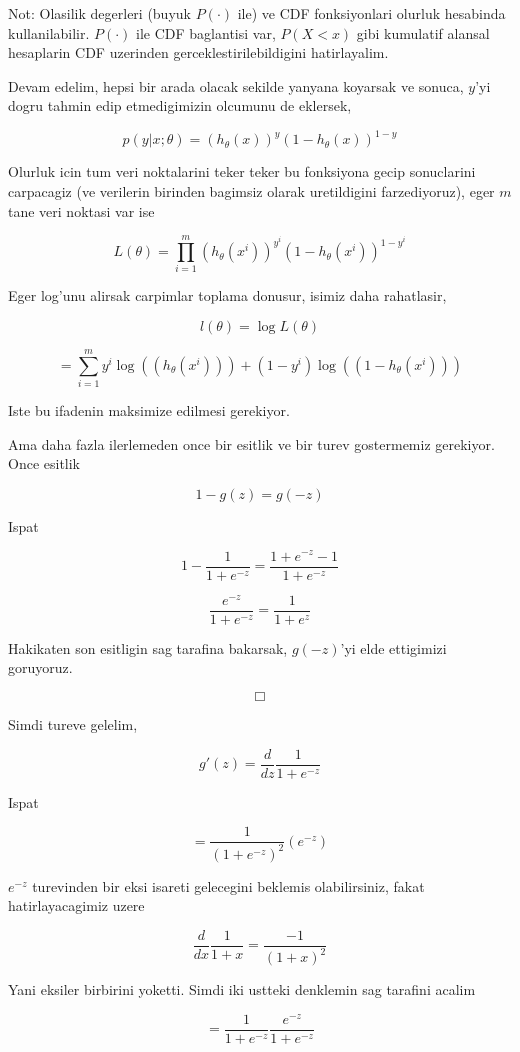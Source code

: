 \documentclass[12pt,fleqn]{article}\usepackage{../common}
\begin{document}
Not: Olasilik degerleri (buyuk $P(\cdot)$ ile) ve CDF fonksiyonlari
olurluk hesabinda kullanilabilir. $P(\cdot)$ ile CDF baglantisi var,
$P(X<x)$ gibi kumulatif alansal hesaplarin CDF uzerinden
gerceklestirilebildigini hatirlayalim.

Devam edelim, hepsi bir arada olacak sekilde yanyana koyarsak ve
sonuca, $y$'yi dogru tahmin edip etmedigimizin olcumunu de eklersek,

$$p(y | x;\theta) = (h_\theta(x))^y (1-h_\theta(x))^{1-y}$$

Olurluk icin tum veri noktalarini teker teker bu fonksiyona gecip
sonuclarini carpacagiz (ve verilerin birinden bagimsiz olarak
uretildigini farzediyoruz), eger $m$ tane veri noktasi var ise

$$ L(\theta) = \prod_{i=1}^{m} (h_\theta(x^i))^{y^i}
(1-h_\theta(x^i))^{1-{y^i}}$$

Eger log'unu alirsak carpimlar toplama donusur, isimiz daha rahatlasir,

$$ l(\theta) = \log L(\theta) $$

$$ = \sum_{i=1}^{m}
     y^i \log( (h_\theta(x^i)) ) +
     (1-{y^i}) \log( (1-h_\theta(x^i)) )
$$

Iste bu ifadenin maksimize edilmesi gerekiyor.

Ama daha fazla ilerlemeden once bir esitlik ve bir turev gostermemiz
gerekiyor.  Once esitlik

$$ 1-g(z) = g(-z) $$

Ispat

$$ 1-\frac{1}{1+e^{-z}}  = \frac{1+e^{-z}-1}{1+e^{-z}}$$

$$ \frac{e^{-z}}{1+e^{-z}} = \frac{1}{1+e^{z}}$$

Hakikaten son esitligin sag tarafina bakarsak, $g(-z)$'yi elde ettigimizi
goruyoruz.

$$ \Box $$

Simdi tureve gelelim,

$$
g'(z) = \frac{d}{dz} \frac{ 1}{1+ e^{ -z}} 
$$

Ispat

$$
= \frac{1}{(1+ e^{-z})^2} (e^{-z}) 
$$

$e^{ -z}$ turevinden bir eksi isareti gelecegini beklemis olabilirsiniz,
fakat hatirlayacagimiz uzere 

$$\frac{d}{dx} \frac{ 1}{1+x}  = \frac{-1}{(1+x)^2}$$

Yani eksiler birbirini yoketti. Simdi iki ustteki denklemin sag tarafini
acalim

$$
 = \frac{1}{1+e^{-z}} \frac{e^{-z}}{1+e^{-z}}
$$
\end{document}
